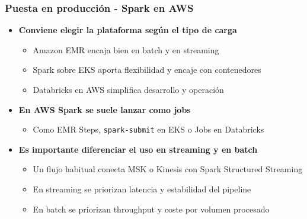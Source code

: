 \documentclass[aspectratio=169]{beamer}
\begin{document}
\begin{frame}\frametitle{Puesta en producción - Spark en AWS}
\begin{itemize}
  \item \textbf{Conviene elegir la plataforma según el tipo de carga}
  \begin{itemize}
    \item Amazon EMR encaja bien en batch y en streaming
    \item Spark sobre EKS aporta flexibilidad y encaje con contenedores
    \item Databricks en AWS simplifica desarrollo y operación
  \end{itemize}

  \vspace{1em}

  \item \textbf{En AWS Spark se suele lanzar como jobs}
  \begin{itemize}
    \item Como EMR Steps, \texttt{spark-submit} en EKS o Jobs en Databricks
  \end{itemize}

  \vspace{1em}

  \item \textbf{Es importante diferenciar el uso en streaming y en batch}
  \begin{itemize}
    \item Un flujo habitual conecta MSK o Kinesis con Spark Structured Streaming
    \item En streaming se priorizan latencia y estabilidad del pipeline
    \item En batch se priorizan throughput y coste por volumen procesado
  \end{itemize}
\end{itemize}
\end{frame}
\end{document}
